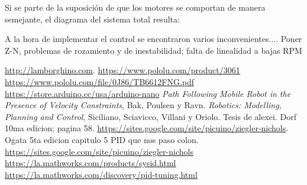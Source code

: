 \documentclass[10pt,conference,a4paper,onecolumn]{article}%
\begin{document}
Si se parte de la suposición de que los motores se comportan de manera semejante, el diagrama del sistema total resulta:



A la hora de implementar el control se encontraron varios inconvenientes.... Poner Z-N, problemas de rozamiento y de inestabilidad; falta de linealidad a bajas RPM


\begin{thebibliography}{X}
 \url{http://lamborghino.com}. 
\url{https://www.pololu.com/product/3061}
\url{ https://www.pololu.com/file/0J86/TB6612FNG.pdf}
 \url{https://store.arduino.cc/usa/arduino-nano}
 \textit{Path Following Mobile Robot in the Presence of Velocity Constraints}, Bak, Poulsen y Ravn.
 \textit{Robotics: Modelling, Planning and Control}, Siciliano, Sciavicco, Villani y Oriolo.
 Tesis de alexei.
 Dorf 10ma edicion; pagina 58.
 \url{https://sites.google.com/site/picuino/ziegler-nichols}.
 Ogata 5ta edicion capitulo 5
 PID que nos paso colon.
\url{https://sites.google.com/site/picuino/ziegler-nichols}
\url{https://la.mathworks.com/products/sysid.html}
\url{https://la.mathworks.com/discovery/pid-tuning.html}
\end{thebibliography}
\end{document}
